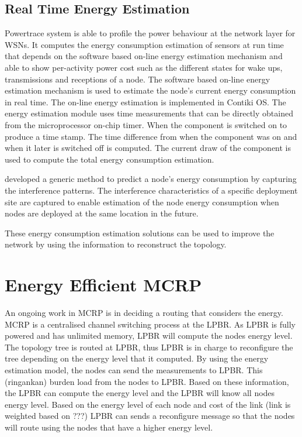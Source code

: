 \subsection{Real Time Energy Estimation}
Powertrace system \cite{dunkels2011powertrace} is able to profile the power behaviour at the network layer for WSNs. It computes the energy consumption estimation of sensors at run time that depends on the software based on-line energy estimation mechanism \cite{dunkels2007software} and able to show per-activity power cost such as the different states for wake ups, transmissions and receptions of a node.
The software based on-line energy estimation mechanism is used to estimate the node's current energy consumption in real time. The on-line energy estimation is implemented in Contiki OS. The energy estimation module uses time measurements that can be directly obtained from the microprocessor on-chip timer. When the component is switched on to produce a time stamp. The time difference from when the component was on and when it later is switched off is computed. The current draw of the component is used to compute the total energy consumption estimation.


\cite{alexlifetime} developed a generic method to predict a node's energy consumption by capturing the interference patterns. The interference characteristics of a specific deployment site are captured to enable estimation of the node energy consumption when nodes are deployed at the same location in the future.

These energy consumption estimation solutions can be used to improve the network by using the information to reconstruct the topology.


\section{Energy Efficient MCRP}
An ongoing work in MCRP is in deciding a routing that considers the energy.
MCRP is a centralised channel switching process at the LPBR. As LPBR is fully powered and has unlimited memory, LPBR will compute the nodes energy level. The topology tree is routed at LPBR, thus LPBR is in charge to reconfigure the tree depending on the energy level that it computed. By using the energy estimation model, the nodes can send the measurements to LPBR. This (ringankan) burden load from the nodes to LPBR. Based on these information, the LPBR can compute the energy level and the LPBR will know all nodes energy level. Based on the energy level of each node and cost of the link (link is weighted based on ???) LPBR can sends a reconfigure message so that the nodes will route using the nodes that have a higher energy level.

